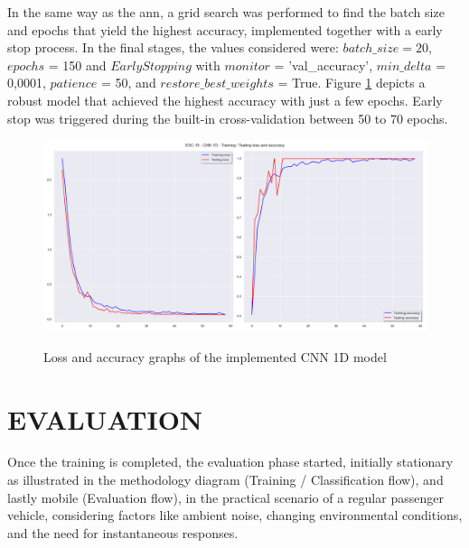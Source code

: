 In the same way as the \gls{ann}, a grid search was performed to find the batch size and epochs that yield the highest accuracy, implemented together with a early stop process. In the final stages, the values considered were: $batch\_size = 20$, $epochs$ = 150 and $EarlyStopping$ with $monitor$ = 'val\_accuracy', $min\_delta$ = 0,0001, $patience$ = 50, and $restore\_best\_weights$ = True. Figure \ref{fig:methods_training_CNN_1D_loss_and_accuracy_graphs} depicts a robust model that achieved the highest accuracy with just a few epochs. Early stop was triggered during the built-in cross-validation between 50 to 70 epochs.


\begin{figure}[htbp]
    \raggedright
        \caption{Loss and accuracy graphs of the implemented CNN 1D model}
        \includegraphics[width=1\textwidth]{resources/images/050-methods/Methods_training_CNN1D_loss_accuracy.png}
        \label{fig:methods_training_CNN_1D_loss_and_accuracy_graphs}
\end{figure} 






\section{EVALUATION}
\label{sec:methods_evaluation}

Once the training is completed, the evaluation phase started, initially stationary as illustrated in the methodology diagram (Training / Classification flow), and lastly mobile (Evaluation flow), in the practical scenario of a regular passenger vehicle, considering factors like ambient noise, changing environmental conditions, and the need for instantaneous responses.

